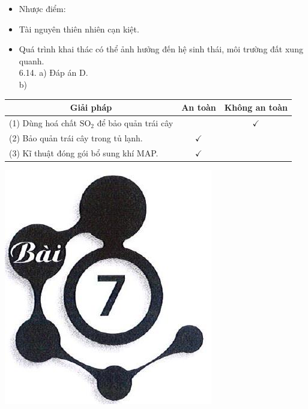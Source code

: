 \documentclass[10pt]{article}
\begin{document}
\begin{itemize}
  \item Nhược điểm:
\end{itemize}

\begin{itemize}
  \item Tài nguyên thiên nhiên cạn kiệt.
  \item Quá trình khai thác có thể ảnh hưởng đến hệ sinh thái, môi trường đất xung quanh.\\
6.14. a) Đáp án D.\\
b)
\end{itemize}

\begin{center}
\begin{tabular}{|l|c|c|}
\hline
\multicolumn{1}{|c|}{Giải pháp} & An toàn & Không an toàn \\
\hline
(1) Dùng hoá chất $\mathrm{SO}_{2}$ để bảo quản trái cây &  & $\checkmark$ \\
\hline
(2) Bảo quản trái cây trong tủ lạnh. & $\checkmark$ &  \\
\hline
(3) Kĩ thuật đóng gói bổ sung khí MAP. & $\checkmark$ &  \\
\hline
\end{tabular}
\end{center}

\begin{center}
\includegraphics[max width=\textwidth]{2025_10_23_adad5b98d65ac6665838g-09(1)}
\end{center}
\end{document}
